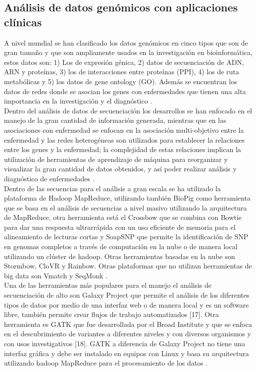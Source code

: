 \subsection{Análisis de datos genómicos con aplicaciones clínicas}

A nivel mundial se han clasificado los datos genómicos en cinco tipos que son de gran tamaño y que son ampliamente usados en la investigación en bioinformática, estos datos son: 1) Los de expresión génica, 2) datos de secuenciación de ADN, ARN y proteínas, 3) los de interacciones entre proteínas (PPI), 4) los de ruta metabólicas y 5) los datos de gene ontology (GO). Además se encuentran los datos de redes donde se asocian los genes con enfermedades que tienen una alta importancia en la investigación y el diagnóstico \cite{Kashyap2015}.\\

Dentro del análisis de datos de secuenciación los desarrollos se han enfocado en el manejo de la gran cantidad de información generada, mientras que en las asociaciones con enfermedad se enfocan en la asociación multi-objetivo entre la enfermedad  y las redes heterogéneas son utilizados para establecer la relaciones entre los genes y la enfermedad; la complejidad de estas relaciones implican la utilización de herramientas de aprendizaje de máquina para reorganizar y visualizar la gran cantidad de datos obtenidos, y así poder realizar análisis y diagnóstico de enfermedades \cite{Kashyap2015}. \\

Dentro de las secuencias para el análisis a gran escala se ha utilizado la plataforma de Hadoop MapReduce, utilizando también BioPig  como herramienta que se basa en el análisis de secuencias a nivel masivo utilizando la arquitectura de MapReduce, otra herramienta está el Crossbow que se combina con Bowtie para dar una respuesta ultrarrápida con un uso eficiente de memoria para el alineamiento de lecturas cortas y SoapSNP que permite la identificación de SNP en genomas completos a través de computación en la nube o de manera local utilizando un clúster de hadoop. Otras herramientas basadas en la nube son Stormbow, CloVR y Rainbow. Otras plataformas que no utilizan herramientas de big data son Vmatch y SeqMonk \cite{Kashyap2015}.\\

Una de las herramientas más populares para el manejo el análisis de secuenciación de alto son Galaxy Project que permite el análisis de los diferentes tipos de datos por medio de una interfaz web o de manera local y es un software libre, también permite crear flujos de trabajo automatizados [17]. Otra herramienta es GATK que fue desarrollada por el Broad Institute y que se enfoca en el descubrimiento de variantes  a diferentes niveles y con diversos organismos y con usos investigativos [18]. GATK a diferencia de Galaxy Project no tiene una interfaz gráfica y debe ser instalado en equipos con Linux y basa su arquitectura utilizando hadoop MapReduce para el procesamiento de los datos \cite{Maharjan2011} .\\

